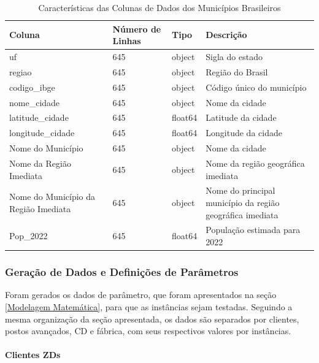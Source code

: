 \begin{table}[h!]
\centering
\caption{Características das Colunas de Dados dos Municípios Brasileiros}
\label{tab:dados_municipios}
\begin{tabular}{|p{5cm}|p{2cm}|p{2cm}|p{5cm}|} %
\hline
\textbf{Coluna} & \textbf{Número de Linhas} & \textbf{Tipo} & \textbf{Descrição} \\
\hline
uf & 645 & object & Sigla do estado \\
\hline %
regiao & 645 & object & Região do Brasil \\
\hline %
codigo\_ibge & 645 & object & Código único do município \\
\hline %
nome\_cidade & 645 & object & Nome da cidade \\
\hline %
latitude\_cidade & 645 & float64 & Latitude da cidade \\
\hline %
longitude\_cidade & 645 & float64 & Longitude da cidade \\
\hline %
Nome do Município & 645 & object & Nome da cidade \\
\hline %
Nome da Região Imediata & 645 & object & Nome da região geográfica imediata \\
\hline %
Nome do Município da Região Imediata & 645 & object & Nome do principal município da região geográfica imediata \\
\hline %
Pop\_2022 & 645 & float64 & População estimada para 2022 \\
\hline
\end{tabular}
\end{table}

\subsubsection[Geração de Dados e Definições de Parâmetros]{Geração de Dados e Definições de Parâmetros}
\label{Geração de Dados}\par

Foram gerados os dados de parâmetro, que foram apresentados na seção \ref{Modelagem Matemática}, para que as instâncias sejam testadas. Seguindo a mesma organização da seção apresentada, os dados são separados por clientes, postos avançados, CD e fábrica, com seus respectivos valores por instâncias.

\paragraph[Clientes ZDs]{Clientes ZDs}
\label{Clientes}


